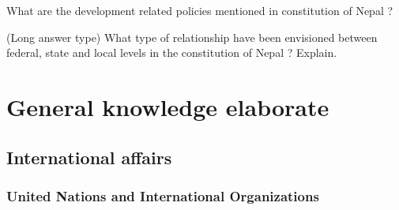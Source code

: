 \documentclass[
  openany]{book}
\newcommand{\question}{\item}
\begin{document}
\begin{questions}

\question What are the development related policies mentioned in constitution of Nepal ?

\question (Long answer type) What type of relationship have been envisioned between federal, state and local levels in the constitution of Nepal ? Explain.

\end{questions}

\hypertarget{general-knowledge-elaborate}{%
\chapter{General knowledge elaborate}\label{general-knowledge-elaborate}}

\hypertarget{international-affairs}{%
\section{International affairs}\label{international-affairs}}

\hypertarget{united-nations-and-international-organizations}{%
\subsection{United Nations and International Organizations}\label{united-nations-and-international-organizations}}
\end{document}
